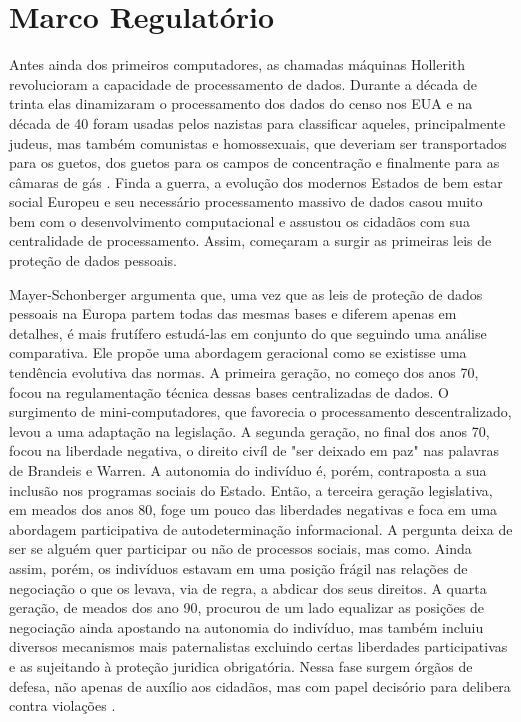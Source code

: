 \section{Marco Regulatório}
\label{sec:marco-regulatorio}

Antes ainda dos primeiros computadores, as chamadas máquinas Hollerith revolucioram a capacidade de processamento de dados.
Durante a década de trinta elas dinamizaram o processamento dos dados do censo nos EUA e na década de 40 foram usadas pelos nazistas para classificar aqueles, principalmente judeus, mas também comunistas e homossexuais, que deveriam ser transportados para os guetos, dos guetos para os campos de concentração e finalmente para as câmaras de gás \cite{Black01}.
Finda a guerra, a evolução dos modernos Estados de bem estar social Europeu e seu necessário processamento massivo de dados casou muito bem com o desenvolvimento computacional e assustou os cidadãos com sua centralidade de processamento.
Assim, começaram a surgir as primeiras leis de proteção de dados pessoais.

Mayer-Schonberger argumenta que, uma vez que as leis de proteção de dados pessoais na Europa partem todas das mesmas bases e diferem apenas em detalhes, é mais frutífero estudá-las em conjunto do que seguindo uma análise comparativa.
Ele propõe uma abordagem geracional como se existisse uma tendência evolutiva das normas.
A primeira geração, no começo dos anos 70, focou na regulamentação técnica dessas bases centralizadas de dados.
O surgimento de mini-computadores, que favorecia o processamento descentralizado, levou a uma adaptação na legislação.
A segunda geração, no final dos anos 70, focou na liberdade negativa, o direito civíl de "ser deixado em paz" nas palavras de Brandeis e Warren.
A autonomia do indivíduo é, porém, contraposta a sua inclusão nos programas sociais do Estado.
Então, a terceira geração legislativa, em meados dos anos 80, foge um pouco das liberdades negativas e foca em uma abordagem participativa de autodeterminação informacional.
A pergunta deixa de ser se alguém quer participar ou não de processos sociais, mas como.
Ainda assim, porém, os indivíduos estavam em uma posição frágil nas relações de negociação o que os levava, via de regra, a abdicar dos seus direitos.
A quarta geração, de meados dos ano 90, procurou de um lado equalizar as posições de negociação ainda apostando na autonomia do indivíduo, mas também incluiu diversos mecanismos mais paternalistas excluindo certas liberdades participativas e as sujeitando à proteção juridica obrigatória.
Nessa fase surgem órgãos de defesa, não apenas de auxílio aos cidadãos, mas com papel decisório para delibera contra violações \cite{Mayer-Schonberger97}.

